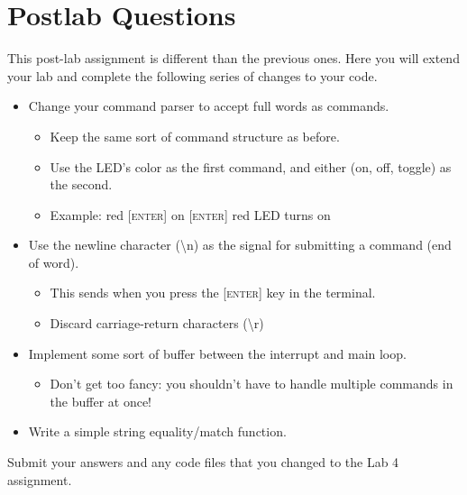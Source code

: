 \documentclass[openany,11pt,fleqn]{book} %
\begin{document}
\section{\color{blue}Postlab Questions}
\begin{question}[Postlab 4]
	This post-lab assignment is different than the previous ones. Here you will extend your lab and complete the following series of changes to your code.
	\begin{itemize}
		\item Change your command parser to accept full words as commands.
		\begin{itemize}
			\item Keep the same sort of command structure as before.
			\item Use the LED's color as the first command, and either (on, off, toggle) as the second.
			\item Example: red \textsc{[enter]} on \textsc{[enter]} \textrightarrow{} red LED turns on
		\end{itemize}
		\item Use the newline character (\textbackslash n) as the signal for submitting a command (end of word).
		\begin{itemize}
			\item This sends when you press the \textsc{[enter]} key in the terminal.
			\item Discard carriage-return characters (\textbackslash r)
		\end{itemize}
		\item Implement some sort of buffer between the interrupt and main loop.
		\begin{itemize}
			\item Don't get too fancy: you shouldn't have to handle multiple commands in the buffer at once!
		\end{itemize}
		\item Write a simple string equality/match function. 
	\end{itemize}
	Submit your answers and any code files that you changed to the Lab 4 assignment.
\end{question}
\end{document}
